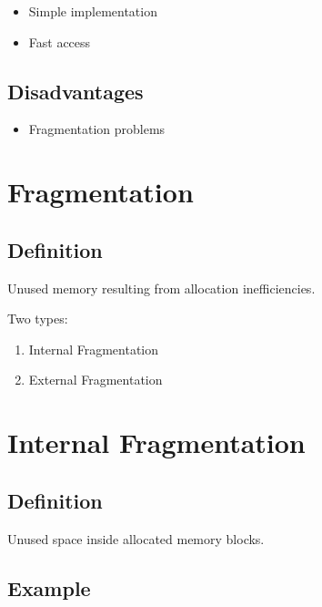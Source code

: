 \begin{itemize}
\item Simple implementation
\item Fast access
\end{itemize}

\subsection{Disadvantages}

\begin{itemize}
\item Fragmentation problems
\end{itemize}

\section{Fragmentation}

\subsection{Definition}

Unused memory resulting from allocation inefficiencies.

Two types:

\begin{enumerate}
\item Internal Fragmentation
\item External Fragmentation
\end{enumerate}

\section{Internal Fragmentation}

\subsection{Definition}

Unused space inside allocated memory blocks.

\subsection{Example}

